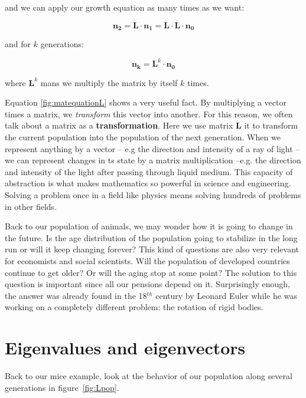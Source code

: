 \documentclass{tufte-book} %
\begin{document}
and we can apply our growth equation as many times as we want:

\begin{equation}
	\mathbf{n_{2}} =\mathbf{L} \cdot \mathbf{n_1} = \mathbf{L} \cdot \mathbf{L} \cdot \mathbf{n_0} 
\end{equation}

and for $k$ generations:

\begin{equation}
	\mathbf{n_k} =\mathbf{L}^k \cdot \mathbf{n_0}
\end{equation}

where $\mathbf{L}^k$ mans we multiply the matrix by itself $k$ times.

Equation \ref{fig:matequationL} shows a very useful fact.  By multiplying a vector times a matrix, we \emph{transform} this vector into another. For this reason, we often talk about a matrix as a \textbf{transformation}.  Here we use matrix $\mathbf{L}$ it to transform the current population into the population of the next generation. When we represent anything by a vector -- e.g the direction and intensity of a ray of light -- we can represent changes in ts state by a matrix multiplication --e.g. the direction and intensity of the light after passing through liquid medium. This capacity of abstraction is what makes mathematics so powerful in science and engineering. Solving a problem once in a field like physics means solving hundreds of problems in other fields.

Back to our population of animals, we may wonder how it is going to change in the future.  Is the age distribution of the population going to stabilize in the long run or will it keep changing forever? This kind of questions are also very relevant for economists and social scientists. Will the population of developed countries continue to get older? Or will the aging stop at some point? The solution to this question is important since all our pensions depend on it. Surprisingly enough, the answer was already found in the 18$^{th}$ century by Leonard Euler while he was working on a completely different problem: the rotation of rigid bodies.

\section{Eigenvalues and eigenvectors}

Back to our mice example, look at the behavior of our population along several generations in figure~\ref{fig:Lpop}.
\end{document}
